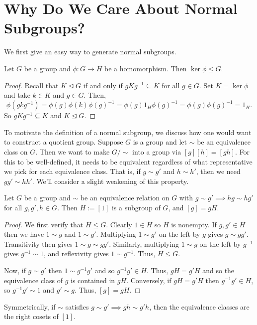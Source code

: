 \documentclass{article}
\begin{document}
\section{Why Do We Care About Normal Subgroups?}

We first give an easy way to generate normal subgroups.

\begin{prop*} Let $G$ be a group and $\phi:G\to H$ be a homomorphism. Then $\ker\phi\unlhd G$.\end{prop*}
\begin{proof} Recall that $K\unlhd G$ if and only if $gKg^{-1}\subseteq K$ for all $g\in G$. Set $K=\ker\phi$ and take $k\in K$ and $g\in G$. Then,
$$\phi(gkg^{-1})=\phi(g)\phi(k)\phi(g)^{-1}=\phi(g)1_H\phi(g)^{-1}=\phi(g)\phi(g)^{-1}=1_H.$$
So $gKg^{-1}\subseteq K$ and $K\unlhd G$.
\end{proof}

To motivate the definition of a normal subgroup, we discuss how one would want to construct a quotient group. Suppose $G$ is a group and let $\sim$ be an equivalence class on $G$. Then we want to make $G/\sim$ into a group via $[g][h]=[gh]$. For this to be well-defined, it needs to be equivalent regardless of what representative we pick for each equivalence class. That is, if $g\sim g'$ and $h\sim h'$, then we need $gg'\sim hh'$. We'll consider a slight weakening of this property.

\begin{prop*} Let $G$ be a group and $\sim$ be an equivalence relation on $G$ with $g\sim g'\implies hg\sim hg'$ for all $g,g',h\in G$. Then $H:=[1]$ is a subgroup of $G$, and $[g]=gH$.\end{prop*}
\begin{proof} We first verify that $H\leq G$. Clearly $1\in H$ so $H$ is nonempty. If $g,g'\in H$ then we have $1\sim g$ and $1\sim g'$. Multiplying $1\sim g'$ on the left by $g$ gives $g\sim gg'$. Transitivity then gives $1\sim g\sim gg'$. Similarly, multiplying $1\sim g$ on the left by $g^{-1}$ gives $g^{-1}\sim 1$, and reflexivity gives $1\sim g^{-1}$. Thus, $H\leq G$.

Now, if $g\sim g'$ then $1\sim g^{-1}g'$ and so $g^{-1}g'\in H$. Thus, $gH=g'H$ and so the equivalence class of $g$ is contained in $gH$. Conversely, if $gH=g'H$ then $g^{-1}g'\in H$, so $g^{-1}g'\sim 1$ and $g'\sim g$. Thus, $[g]=gH$.
\end{proof}

Symmetrically, if $\sim$ satisfies $g\sim g'\implies gh\sim g'h$, then the equivalence classes are the right cosets of $[1]$.
\end{document}
